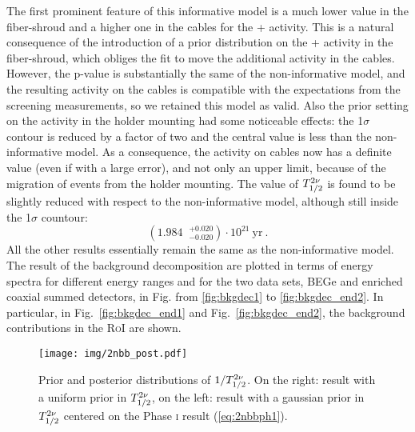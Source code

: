  The first prominent feature of this informative model is a much lower value in the fiber-shroud and a higher one in the cables for the  +  activity. This is a natural consequence of the introduction of a prior distribution on the  +  activity in the fiber-shroud, which obliges the fit to move the additional activity in the cables. However, the p-value is substantially the same of the non-informative model, and the resulting activity on the cables is compatible with the expectations from the screening measurements, so we retained this model as valid. Also the prior setting on the  activity in the holder mounting had some noticeable effects: the 1$\sigma$ contour is reduced by a factor of two and the central value is less than the non-informative model. As a consequence, the  activity on cables now has a definite value (even if with a large error), and not only an upper limit, because of the migration of events from the holder mounting. The value of $T_{1/2}^{2\nu}$ is found to be slightly reduced with respect to the non-informative model, although still inside the 1$\sigma$ countour:
\begin{equation}(1.984\;\;^{+0.020}_{-0.020})\cdot10^{21}\ \text{yr}\ .\label{eq:stat_result}\end{equation}
	All the other results essentially remain the same as the non-informative model. The result of the background decomposition are plotted in terms of energy spectra for different energy ranges and for the two data sets, BEGe and enriched coaxial summed detectors, in Fig. from \ref{fig:bkgdec1} to \ref{fig:bkgdec_end2}. In particular, in Fig.~\ref{fig:bkgdec_end1} and Fig.~\ref{fig:bkgdec_end2}, the background contributions in the \textsc{RoI} are shown.
\begin{figure}
	\centering
	\texttt{[image: img/2nbb\_post.pdf]}
	\caption{Prior and posterior distributions of $1/T_{1/2}^{2\nu}$. On the right: result with a uniform prior in $T_{1/2}^{2\nu}$, on the left: result with a gaussian prior in $T_{1/2}^{2\nu}$ centered on the {\gerda} Phase \textsc{i} result (\ref{eq:2nbbph1}).}\label{fig:2nbbpost}
\end{figure}
